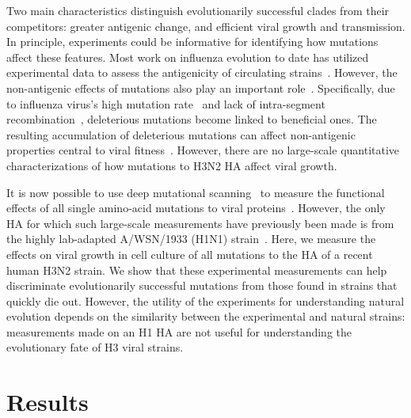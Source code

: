 \documentclass[9pt,twocolumn,twoside]{pnas-new}
\begin{document}
Two main characteristics distinguish evolutionarily successful clades from their competitors: greater antigenic change, and efficient viral growth and transmission.
In principle, experiments could be informative for identifying how mutations affect these features.
Most work on influenza evolution to date has utilized experimental data to assess the antigenicity of circulating strains~\cite{sun2013using,harvey2016identification,neher2016prediction,koel2013substitutions,chambers2015identification,li2016selection}.
However, the non-antigenic effects of mutations also play an important role~\cite{pybus2007phylogenetic,strelkowa2012clonal,luksza2014predictive,koelle2015effects}.
Specifically, due to influenza virus's high mutation rate~\cite{holland1982rapid,steinhauer1987rapid,lauring2010quasispecies} and lack of intra-segment recombination~\cite{boni2008homologous}, deleterious mutations become linked to beneficial ones.
The resulting accumulation of deleterious mutations can affect non-antigenic properties central to viral fitness~\cite{luksza2014predictive}.
However, there are no large-scale quantitative characterizations of how mutations to H3N2 HA affect viral growth.

It is now possible to use deep mutational scanning~\cite{fowler2014deep} to measure the functional effects of all single amino-acid mutations to viral proteins~\cite{thyagarajan2014inherent,wu2014high,doud2016accurate,haddox2016experimental,qi2015high,haddox2018mapping}.
However, the only HA for which such large-scale measurements have previously been made is from the highly lab-adapted A/WSN/1933 (H1N1) strain~\cite{thyagarajan2014inherent,wu2014high,doud2016accurate}.
Here, we measure the effects on viral growth in cell culture of all mutations to the HA of a recent human H3N2 strain.
We show that these experimental measurements can help discriminate evolutionarily successful mutations from those found in strains that quickly die out.
However, the utility of the experiments for understanding natural evolution depends on the similarity between the experimental and natural strains: measurements made on an H1 HA are not useful for understanding the evolutionary fate of H3 viral strains.

\section*{Results}
\label{sec:results}
\end{document}
